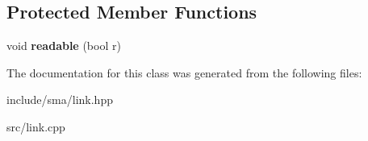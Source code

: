 \subsection*{Protected Member Functions}
\begin{DoxyCompactItemize}
\item 
\hypertarget{classsma_1_1Link_ab0cd9db02000b582c5f8e770b1cec242}{void {\bfseries readable} (bool r)}\label{classsma_1_1Link_ab0cd9db02000b582c5f8e770b1cec242}

\end{DoxyCompactItemize}


The documentation for this class was generated from the following files\-:\begin{DoxyCompactItemize}
\item 
include/sma/link.\-hpp\item 
src/link.\-cpp\end{DoxyCompactItemize}
